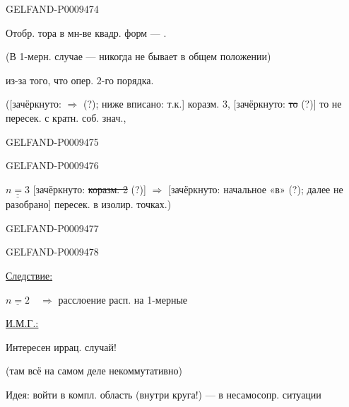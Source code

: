 \begin{GelfandAdjacentEvidence}{GELFAND-P000947}{4}


Отобр. тора в мн-ве квадр. форм --- .

(В 1-мерн. случае --- никогда не бывает в общем положении)

из-за того, что опер. 2-го порядка.

([зачёркнуто: $\Rightarrow$ (?); ниже вписано: т.к.] коразм. 3,
[зачёркнуто: \sout{то} (?)] то не пересек. с кратн. соб. знач.,
\end{GelfandAdjacentEvidence}
\begin{GelfandAdjacentEvidence}{GELFAND-P000947}{5}

\end{GelfandAdjacentEvidence}
\begin{GelfandAdjacentEvidence}{GELFAND-P000947}{6}


$\underline{\underline{n=3}}$ [зачёркнуто: \sout{коразм. 2} (?)] $\Rightarrow$
[зачёркнуто: начальное «в» (?); далее не разобрано] пересек. в изолир. точках.)
\end{GelfandAdjacentEvidence}
\begin{GelfandAdjacentEvidence}{GELFAND-P000947}{7}

\end{GelfandAdjacentEvidence}
\begin{GelfandAdjacentEvidence}{GELFAND-P000947}{8}

\end{GelfandAdjacentEvidence}


\underline{\underline{Следствие:}}

$\underline{n=2}\quad\Rightarrow$ расслоение расп. на 1-мерные

\underline{\underline{И.М.Г.:}}

Интересен иррац. случай!

(там всё на самом деле некоммутативно)

Идея: войти в компл. область (внутри круга!) --- в несамосопр. ситуации

